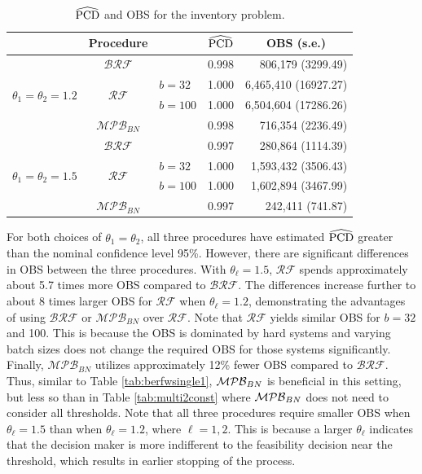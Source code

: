 \documentclass[11pt]{article}
\begin{document}
\begin{table}[h!] 

    \centering
    \renewcommand{\arraystretch}{0.8}
    \caption{$\widehat{{\rm PCD}}$ and OBS for the inventory problem.} \label{tab:multiwith2constraints}
    \begin{tabular}{c|clrr}
    \toprule
    & Procedure & & \multicolumn{1}{c}{$\widehat{{\rm PCD}}$} & \multicolumn{1}{c}{OBS (s.e.)} \\ \midrule
    \multirow{4}{*}{$\theta_1 = \theta_2 = 1.2$} & $\mathcal{BRF}$ & & 0.998 & 806,179 (3299.49)  \\ \cline{2-5} 
    & \multirow{2}{*}{$\mathcal{RF}$} & $b=32$ & 1.000 & 6,465,410 (16927.27) \\ \cline{3-5} 
    & & $b=100$ & 1.000 & 6,504,604 (17286.26) \\  \cline{2-5} 
    & $\mathcal{MPB}_{BN}$ & & 0.998 & 716,354 (2236.49) \\ \midrule
    \multirow{4}{*}{$\theta_1 = \theta_2 = 1.5$} & $\mathcal{BRF}$ & & 0.997 & 280,864 (1114.39) \\ \cline{2-5} 
   & \multirow{2}{*}{$\mathcal{RF}$} & $b=32$ & 1.000 & 1,593,432 (3506.43) \\ \cline{3-5} 
   & & $b=100$ & 1.000 & 1,602,894 (3467.99) \\ \cline{2-5}
   & $\mathcal{MPB}_{BN}$ & & 0.997 & 242,411 (741.87) \\  
   \bottomrule
    \end{tabular}
\end{table}

For both choices of $\theta_1=\theta_2$, all three procedures have estimated $\widehat{{\rm PCD}}$ greater than the nominal confidence level 95\%. However, there are significant differences in OBS between the three procedures. With $\theta_\ell = 1.5$, $\mathcal{RF}$ spends approximately about 5.7 times more OBS compared to $\mathcal{BRF}$. 
The differences increase further to about 8 times larger OBS for $\mathcal{RF}$ when $\theta_\ell = 1.2$, demonstrating the advantages of using $\mathcal{BRF}$ or $\mathcal{MPB}_{BN}$ over $\mathcal{RF}$. Note that $\mathcal{RF}$ yields similar OBS for $b=32$ and 100. This is because the OBS is dominated by hard systems and varying batch sizes does not change the required OBS for those systems significantly. Finally, $\mathcal{MPB}_{BN}$ utilizes approximately 12\% fewer OBS compared to $\mathcal{BRF}$. Thus, similar to Table \ref{tab:berfwsingle1}, ${\cal MPB}_{BN}$ is beneficial in this setting, but less so than in Table \ref{tab:multi2const} where ${\cal MPB}_{BN}$ does not need to consider all thresholds. 
Note that all three procedures require smaller OBS when $\theta_\ell=1.5$ than when $\theta_\ell=1.2$, where $\ell=1,2$. This is because a larger $\theta_\ell$ indicates that the decision maker is more indifferent to the feasibility decision near the threshold, which results in earlier stopping of the process. 
\end{document}
